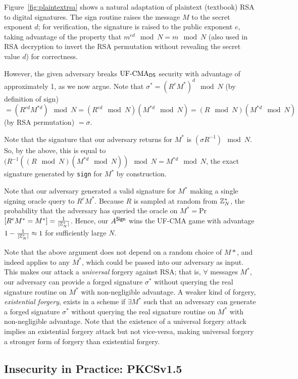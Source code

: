 Figure~\ref{fig:plaintextrsa} shows a natural adaptation of plaintext (textbook) RSA to digital signatures.  The sign routine raises the message $M$ to the secret exponent $d$; for verification, the signature is raised to the public exponent $e$, taking advantage of the property that $m^{ed}\mod N=m\mod N$ (also used in RSA decryption to invert the RSA permutation without revealing the secret value $d$) for correctness.

However, the given adversary breaks $\textnormal{UF-CMA}_{{\mathsf{DS}}}$ security with advantage of approximately 1, as we now argue.  Note that $\sigma^* = (R^e M^*)^d\mod N$ (by definition of sign) $ = (R^{ed} M^{*d})\mod N = (R^{ed}\mod N) (M^{*d}\mod N) = (R\mod N) (M^{*d}\mod N)$ (by RSA permutation) $ = \sigma$.

Note that the signature that our adversary returns for $M^*$ is $(\sigma R^{-1})\mod N$.  So, by the above, this is equal to $(R^{-1} ((R\mod N) (M^{*d}\mod N))\mod N = M^{*d}\mod N$, the exact signature generated by \texttt{sign} for $M^*$ by construction.

Note that our adversary generated a valid signature for $M^*$ making a single signing oracle query to $R^e M^*$.  Because $R$ is sampled at random from ${{\mathbb Z}}^*_N$, the probability that the adversary has queried the oracle on $M^* = $Pr$[R^e M^*=M^*] = \frac{1}{|{{\mathbb Z}}^*_N|}$.  Hence, our $A^{\textsf{Sign}}$ wins the UF-CMA game with advantage $1 - \frac{1}{|{{\mathbb Z}}^*_N|} \approx 1$ for sufficiently large $N$.

Note that the above argument does not depend on a random choice of $M*$, and indeed applies to any $M^*$, which could be passed into our adversary as input.  This makes our attack a \emph{universal} forgery against RSA; that is, $\forall$ messages $M^*$, our adversary can provide a forged signature $\sigma^*$ without querying the real signature routine on $M^*$ with non-negligible advantage.  A weaker kind of forgery, \emph{existential forgery}, exists in a scheme if $\exists M^*$ such that an adversary can generate a forged signature $\sigma^*$ without querying the real signature routine on $M^*$ with non-negligible advantage.  Note that the existence of a universal forgery attack implies an existential forgery attack but not vice-versa, making universal forgery a stronger form of forgery than existential forgery.

\subsection{Insecurity in Practice: PKCSv1.5}


